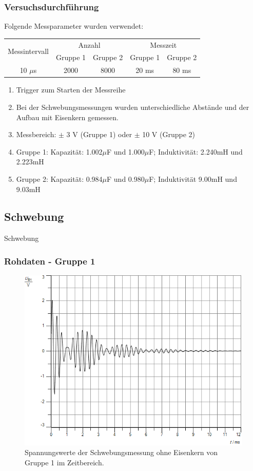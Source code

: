 \documentclass{beamer}
\begin{document}
\begin{frame}
\frametitle{Versuchsdurchführung}
Folgende Messparameter wurden verwendet:
\begin{table}
\begin{tabular}{|c|c|c|c|c|}
\hline
\multirow{2}{*}{Messintervall} & \multicolumn{2}{c|}{Anzahl} & \multicolumn{2}{c|}{Messzeit} \\
\cline{2-5}
& Gruppe 1 & Gruppe 2 & Gruppe 1 & Gruppe 2 \\
\hline
10 $\mu$s & 2000 & 8000 & 20 ms & 80 ms \\
\hline
\end{tabular}
\end{table}

\begin{enumerate}[-]
\item Trigger zum Starten der Messreihe
\item Bei der Schwebungsmessungen wurden unterschiedliche Abstände und der Aufbau mit Eisenkern gemessen.
\item Messbereich: $\pm$ 3 V (Gruppe 1) oder $\pm$ 10 V (Gruppe 2)
\item Gruppe 1: Kapazität: 1.002$\mu$F und 1.000$\mu$F; Induktivität: 2.240mH und 2.223mH
\item Gruppe 2: Kapazität: 0.984$\mu$F und 0.980$\mu$F; Induktivität 9.00mH und 9.03mH
\end{enumerate}

\end{frame}

\subsection{Schwebung}
\begin{frame}
\centering
\Large{Schwebung}
\end{frame}


\begin{frame}
\frametitle{Rohdaten - Gruppe 1}
\begin{figure}
\includegraphics[width = .7\framewidth]{abbildungen/plotsLC/Schwebung.png}
\caption{Spannungswerte der Schwebungsmessung ohne Eisenkern von Gruppe 1 im Zeitbereich.}
\end{figure}
\end{frame}
\end{document}

